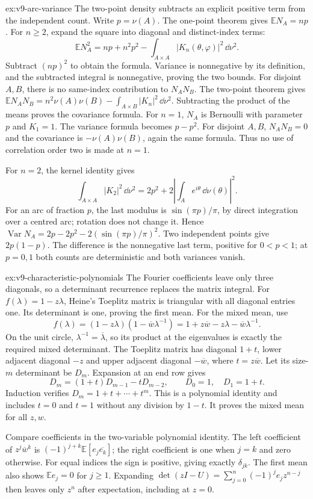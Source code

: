 \begin{solution}{ex:v9-arc-variance}
\idea The two-point density subtracts an explicit positive term from the
independent count.
\writeup Write $p=\nu(A)$. The one-point theorem gives
$\mathbb EN_A=np$.
For $n\ge2$, expand the square into diagonal and distinct-index terms:
\[
 \mathbb EN_A^2=np+n^2p^2
       -\int_{A\times A}|K_n(\theta,\varphi)|^2\,\dd\nu^2.
\]
Subtract $(np)^2$ to obtain the formula.
Variance is nonnegative by its definition, and the subtracted integral
is nonnegative, proving the two bounds.
For disjoint $A,B$, there is no same-index contribution to $N_AN_B$.
The two-point theorem gives
$\mathbb EN_AN_B=n^2\nu(A)\nu(B)-\int_{A\times B}|K_n|^2\,\dd\nu^2$.
Subtracting the product of the means proves the covariance formula.
For $n=1$, $N_A$ is Bernoulli with parameter $p$ and $K_1=1$.
The variance formula becomes $p-p^2$.
For disjoint $A,B$, $N_AN_B=0$ and the covariance is
$-\nu(A)\nu(B)$, again the same formula. Thus no use of correlation
order two is made at $n=1$.

For $n=2$, the kernel identity gives
\[
 \int_{A\times A}|K_2|^2\,\dd\nu^2
 =2p^2+2\left|\int_A e^{i\theta}\,\dd\nu(\theta)\right|^2.
\]
For an arc of fraction $p$, the last modulus is $\sin(\pi p)/\pi$,
by direct integration over a centred arc; rotation does not change it.
Hence
$\operatorname{Var}N_A=2p-2p^2-2(\sin(\pi p)/\pi)^2$.
Two independent points give $2p(1-p)$.
The difference is the nonnegative last term, positive for $0<p<1$;
at $p=0,1$ both counts are deterministic and both variances vanish.
\end{solution}
\begin{solution}{ex:v9-characteristic-polynomials}
\idea The Fourier coefficients leave only three diagonals, so a determinant
recurrence replaces the matrix integral.
\writeup For $f(\lambda)=1-z\lambda$, Heine's Toeplitz matrix is
triangular with all diagonal entries one. Its determinant is one, proving
the first mean.
For the mixed mean, use
\[
 f(\lambda)=(1-z\lambda)(1-\overline w\lambda^{-1})
 =1+z\overline w-z\lambda-\overline w\lambda^{-1}.
\]
On the unit circle, $\lambda^{-1}=\overline\lambda$, so its product
at the eigenvalues is exactly the required mixed determinant.
The Toeplitz matrix has diagonal $1+t$, lower adjacent diagonal $-z$
and upper adjacent diagonal $-\overline w$, where $t=z\overline w$.
Let its size-$m$ determinant be $D_m$. Expansion at an end row gives
\[
 D_m=(1+t)D_{m-1}-tD_{m-2},\qquad D_0=1,\quad D_1=1+t.
\]
Induction verifies $D_m=1+t+\cdots+t^m$.
This is a polynomial identity and includes $t=0$ and $t=1$ without
any division by $1-t$. It proves the mixed mean for all $z,w$.

Compare coefficients in the two-variable polynomial identity.
The left coefficient of $z^j\overline w^k$ is
$(-1)^{j+k}\mathbb E[e_j\overline{e_k}]$;
the right coefficient is one when $j=k$ and zero otherwise.
For equal indices the sign is positive, giving exactly $\delta_{jk}$.
The first mean also shows $\mathbb Ee_j=0$ for $j\ge1$.
Expanding $\det(zI-U)=\sum_{j=0}^n(-1)^je_jz^{n-j}$ then leaves
only $z^n$ after expectation, including at $z=0$.
\end{solution}


